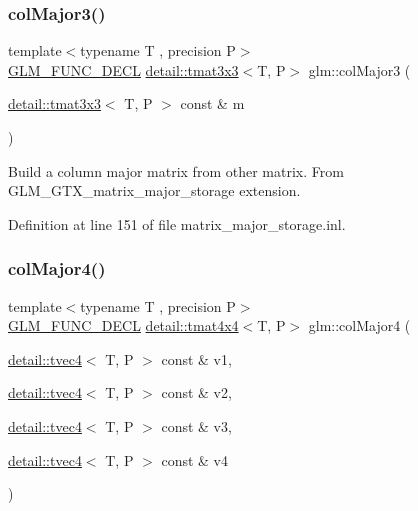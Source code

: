 \subsubsection{\texorpdfstring{col\+Major3()}{colMajor3()}\hspace{0.1cm}{\footnotesize\ttfamily [2/2]}}
{\footnotesize\ttfamily template$<$typename T , precision P$>$ \\
\hyperlink{setup_8hpp_ab2d052de21a70539923e9bcbf6e83a51}{G\+L\+M\+\_\+\+F\+U\+N\+C\+\_\+\+D\+E\+CL} \hyperlink{structglm_1_1detail_1_1tmat3x3}{detail\+::tmat3x3}$<$T, P$>$ glm\+::col\+Major3 (\begin{DoxyParamCaption}\item[{\hyperlink{structglm_1_1detail_1_1tmat3x3}{detail\+::tmat3x3}$<$ T, P $>$ const \&}]{m }\end{DoxyParamCaption})}

Build a column major matrix from other matrix. From G\+L\+M\+\_\+\+G\+T\+X\+\_\+matrix\+\_\+major\+\_\+storage extension. 

Definition at line 151 of file matrix\+\_\+major\+\_\+storage.\+inl.

\mbox{\label{group__gtx__matrix__major__storage_ga50e127c56370410d8054be2cdef03503}} 
\subsubsection{\texorpdfstring{col\+Major4()}{colMajor4()}\hspace{0.1cm}{\footnotesize\ttfamily [1/2]}}
{\footnotesize\ttfamily template$<$typename T , precision P$>$ \\
\hyperlink{setup_8hpp_ab2d052de21a70539923e9bcbf6e83a51}{G\+L\+M\+\_\+\+F\+U\+N\+C\+\_\+\+D\+E\+CL} \hyperlink{structglm_1_1detail_1_1tmat4x4}{detail\+::tmat4x4}$<$T, P$>$ glm\+::col\+Major4 (\begin{DoxyParamCaption}\item[{\hyperlink{structglm_1_1detail_1_1tvec4}{detail\+::tvec4}$<$ T, P $>$ const \&}]{v1,  }\item[{\hyperlink{structglm_1_1detail_1_1tvec4}{detail\+::tvec4}$<$ T, P $>$ const \&}]{v2,  }\item[{\hyperlink{structglm_1_1detail_1_1tvec4}{detail\+::tvec4}$<$ T, P $>$ const \&}]{v3,  }\item[{\hyperlink{structglm_1_1detail_1_1tvec4}{detail\+::tvec4}$<$ T, P $>$ const \&}]{v4 }\end{DoxyParamCaption})}

